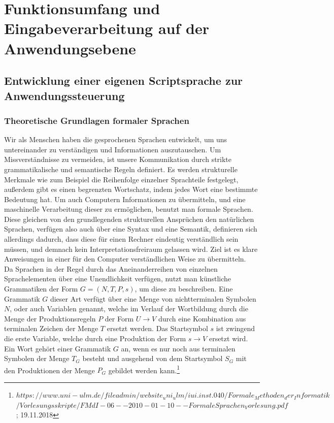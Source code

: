%
%
%
\section{Funktionsumfang und Eingabeverarbeitung auf der Anwendungsebene}

\subsection{Entwicklung einer eigenen Scriptsprache zur Anwendungssteuerung}
\subsubsection{Theoretische Grundlagen formaler Sprachen}
Wir als Menschen haben die gesprochenen Sprachen entwickelt, um uns untereinander zu verständigen und Informationen auszutauschen. Um Missverständnisse zu vermeiden, ist unsere Kommunikation durch strikte grammatikalische und semantische Regeln definiert. Es werden strukturelle Merkmale wie zum Beispiel die Reihenfolge einzelner Sprachteile festgelegt, außerdem gibt es einen begrenzten Wortschatz, indem jedes Wort eine bestimmte Bedeutung hat.
Um auch Computern Informationen zu übermitteln, und eine maschinelle Verarbeitung dieser zu ermöglichen, benutzt man formale Sprachen. Diese gleichen von den grundlegenden strukturellen Ansprüchen den natürlichen Sprachen, verfügen also auch über eine Syntax und eine Semantik, definieren sich allerdings dadurch, dass diese für einen Rechner eindeutig verständlich sein müssen, und demnach kein Interpretationsfreiraum gelassen wird. Ziel ist es klare Anweisungen in einer für den Computer verständlichen Weise zu übermitteln.\\
Da Sprachen in der Regel durch das Aneinanderreihen von einzelnen Sprachelementen über eine Unendlichkeit verfügen, nutzt man künstliche Grammatiken der Form $G = (N, T, P, s)$, um diese zu beschreiben. Eine Grammatik $G$ dieser Art verfügt über eine Menge von nichtterminalen Symbolen $N$, oder auch Variablen genannt, welche im Verlauf der Wortbildung durch die Menge der Produktionsregeln $P$ der Form $U \rightarrow V$ durch eine Kombination aus terminalen Zeichen der Menge $T$ ersetzt werden. Das Startsymbol $s$ ist zwingend die erste Variable, welche durch eine Produktion der Form $s \rightarrow V$ ersetzt wird. Ein Wort gehört einer Grammatik $G$ an, wenn es nur noch aus terminalen Symbolen der Menge $T_G$ besteht und ausgehend von dem Startsymbol $S_G$ mit den Produktionen der Menge $P_G$ gebildet werden kann.\footnote{$	https://www.uni-ulm.de/fileadmin/website_uni_ulm/iui.inst.040/Formale_Methoden_der_Informatik$\\$/Vorlesungsskripte/FMdI-06--2010-01-10--FormaleSprachen_Vorlesung.pdf$
; 19.11.2018}\\
